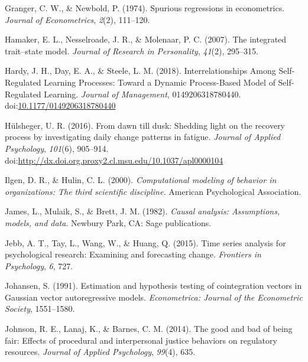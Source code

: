 \documentclass[english,,man]{apa6}
\theoremstyle{definition}
\theoremstyle{definition}
\theoremstyle{definition}
\theoremstyle{remark}
\begin{document}
\leavevmode\hypertarget{ref-granger_spurious_1974}{}%
Granger, C. W., \& Newbold, P. (1974). Spurious regressions in
econometrics. \emph{Journal of Econometrics}, \emph{2}(2), 111--120.

\leavevmode\hypertarget{ref-hamaker2007integrated}{}%
Hamaker, E. L., Nesselroade, J. R., \& Molenaar, P. C. (2007). The
integrated trait--state model. \emph{Journal of Research in
Personality}, \emph{41}(2), 295--315.

\leavevmode\hypertarget{ref-hardy_interrelationships_2018}{}%
Hardy, J. H., Day, E. A., \& Steele, L. M. (2018). Interrelationships
Among Self-Regulated Learning Processes: Toward a Dynamic Process-Based
Model of Self-Regulated Learning. \emph{Journal of Management},
0149206318780440.
doi:\href{https://doi.org/10.1177/0149206318780440}{10.1177/0149206318780440}

\leavevmode\hypertarget{ref-hulsheger_dawn_2016}{}%
Hülsheger, U. R. (2016). From dawn till dusk: Shedding light on the
recovery process by investigating daily change patterns in fatigue.
\emph{Journal of Applied Psychology}, \emph{101}(6), 905--914.
doi:\href{https://doi.org/http://dx.doi.org.proxy2.cl.msu.edu/10.1037/apl0000104}{http://dx.doi.org.proxy2.cl.msu.edu/10.1037/apl0000104}

\leavevmode\hypertarget{ref-ilgen_computational_2000}{}%
Ilgen, D. R., \& Hulin, C. L. (2000). \emph{Computational modeling of
behavior in organizations: The third scientific discipline.} American
Psychological Association.

\leavevmode\hypertarget{ref-james1982causal}{}%
James, L., Mulaik, S., \& Brett, J. M. (1982). \emph{Causal analysis:
Assumptions, models, and data}. Newbury Park, CA: Sage publications.

\leavevmode\hypertarget{ref-jebb_time_2015}{}%
Jebb, A. T., Tay, L., Wang, W., \& Huang, Q. (2015). Time series
analysis for psychological research: Examining and forecasting change.
\emph{Frontiers in Psychology}, \emph{6}, 727.

\leavevmode\hypertarget{ref-johansen_estimation_1991}{}%
Johansen, S. (1991). Estimation and hypothesis testing of cointegration
vectors in Gaussian vector autoregressive models. \emph{Econometrica:
Journal of the Econometric Society}, 1551--1580.

\leavevmode\hypertarget{ref-johnson_good_2014}{}%
Johnson, R. E., Lanaj, K., \& Barnes, C. M. (2014). The good and bad of
being fair: Effects of procedural and interpersonal justice behaviors on
regulatory resources. \emph{Journal of Applied Psychology},
\emph{99}(4), 635.
\end{document}
